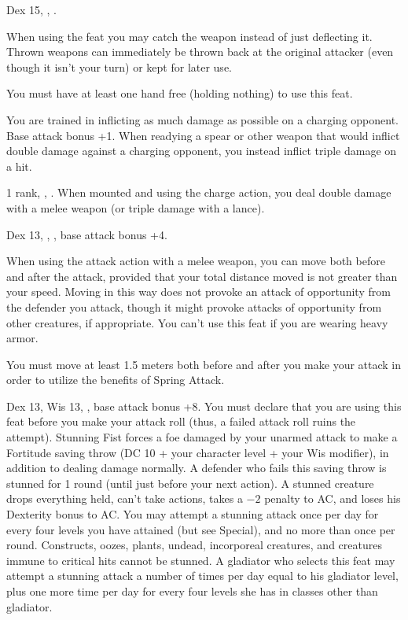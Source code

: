 {Dex 15, , .}
{When using the  feat you may catch the weapon instead of just deflecting it. Thrown weapons can immediately be thrown back at the original attacker (even though it isn't your turn) or kept for later use.

You must have at least one hand free (holding nothing) to use this feat.}

{You are trained in inflicting as much damage as possible on a charging opponent.}
{Base attack bonus +1.}
{When readying a spear or other weapon that would inflict double damage against a charging opponent, you instead inflict triple damage on a hit.}{}{}

{ 1 rank, , .}
{When mounted and using the charge action, you deal double damage with a melee weapon (or triple damage with a lance).}

{Dex 13, , , base attack bonus +4.}
{When using the attack action with a melee weapon, you can move both before and after the attack, provided that your total distance moved is not greater than your speed. Moving in this way does not provoke an attack of opportunity from the defender you attack, though it might provoke attacks of opportunity from other creatures, if appropriate. You can't use this feat if you are wearing heavy armor.

You must move at least 1.5 meters both before and after you make your attack in order to utilize the benefits of Spring Attack.}

{}
{Dex 13, Wis 13, , base attack bonus +8.}
{You must declare that you are using this feat before you make your attack roll (thus, a failed attack roll ruins the attempt). Stunning Fist forces a foe damaged by your unarmed attack to make a Fortitude saving throw (DC 10 + \onehalf your character level + your Wis modifier), in addition to dealing damage normally. A defender who fails this saving throw is stunned for 1 round (until just before your next action). A stunned creature drops everything held, can't take actions, takes a $-2$ penalty to AC, and loses his Dexterity bonus to AC. You may attempt a stunning attack once per day for every four levels you have attained (but see Special), and no more than once per round. Constructs, oozes, plants, undead, incorporeal creatures, and creatures immune to critical hits cannot be stunned.}
{}
{A gladiator who selects this feat may attempt a stunning attack a number of times per day equal to his gladiator level, plus one more time per day for every four levels she has in classes other than gladiator.}

